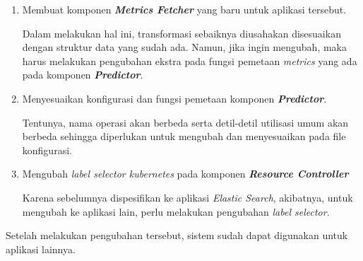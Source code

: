 \begin{enumerate}
    \item Membuat komponen \textbf{\textit{Metrics Fetcher}} yang baru untuk aplikasi tersebut.
        
        Dalam melakukan hal ini, transformasi sebaiknya diusahakan disesuaikan dengan struktur data yang sudah ada. Namun, jika ingin mengubah, maka harus melakukan pengubahan ekstra pada fungsi pemetaan \textit{metrics} yang ada pada komponen \textbf{\textit{Predictor}}.
    \item Menyesuaikan konfigurasi dan fungsi pemetaan komponen \textbf{\textit{Predictor}}.

        Tentunya, nama operasi akan berbeda serta detil-detil utilisasi umum akan berbeda sehingga diperlukan untuk mengubah dan menyesuaikan pada file konfigurasi.

    \item Mengubah \textit{label selector kubernetes} pada komponen \textbf{\textit{Resource Controller}}

        Karena sebelumnya dispesifikan ke aplikasi \textit{Elastic Search}, akibatnya, untuk mengubah ke aplikasi lain, perlu melakukan pengubahan \textit{label selector}.
\end{enumerate}

Setelah melakukan pengubahan tersebut, sistem sudah dapat digunakan untuk aplikasi lainnya.
